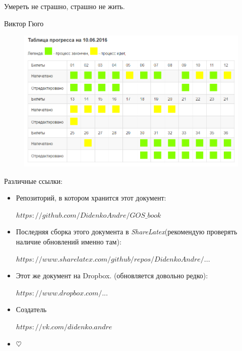 \epigraph{Умереть не страшно, страшно не жить.}{Виктор Гюго}

\begin{figure}[h!]
\includegraphics[width=\textwidth]{pictures/progress}
\end{figure}

\mbox{}

Различные ссылки:
\begin{itemize}
\item

Репозиторий, в котором хранится этот документ:

\href{https://github.com/DidenkoAndre/GOS_book}{$https://github.com/DidenkoAndre/GOS\_book$}

\item
Последняя сборка этого документа в \textit{ShareLatex}\newline (рекомендую проверять наличие обновлений именно там): 

\href{https://www.sharelatex.com/github/repos/DidenkoAndre/GOS_book/builds/latest/output.pdf}{$https://www.sharelatex.com/github/repos/DidenkoAndre/...$}

\item

Этот же документ на Dropbox.  \newline (обновляется довольно редко):

\href{https://www.dropbox.com/sh/7e5mfj8q68o2ipp/AAD8XvpZhiJzFbEh_IeH305ia?dl=0&preview=GOSMat.pdf}{$https://www.dropbox.com/...$}

\item
Создатель

\href{https://vk.com/didenko.andre}{$https://vk.com/didenko.andre$}

\item

$\heartsuit$
\end{itemize}
